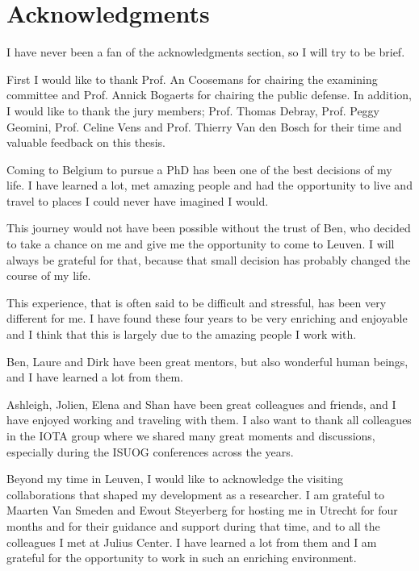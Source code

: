 \chapter*{Acknowledgments}

I have never been a fan of the acknowledgments section, so I will try to be brief.

\vspace{1em}

First I would like to thank Prof. An Coosemans for chairing the examining committee and Prof. Annick Bogaerts for chairing the public defense. In addition, I would like to thank the jury members; Prof. Thomas Debray, Prof. Peggy Geomini, Prof. Celine Vens and Prof. Thierry Van den Bosch for their time and valuable feedback on this thesis.

\vspace{1em}

Coming to Belgium to pursue a PhD has been one of the best decisions of my life. I have learned a lot, met amazing people and had the opportunity to live and travel to places I could never have imagined I would. 

This journey would not have been possible without the trust of Ben, who decided to take a chance on me and give me the opportunity to come to Leuven. I will always be grateful for that, because that small decision has probably changed the course of my life. 

This experience, that is often said to be difficult and stressful, has been very different for me. I have found these four years to be very enriching and enjoyable and I think that this is largely due to the amazing people I work with. 

\vspace{1em}

Ben, Laure and Dirk have been great mentors, but also wonderful human beings, and I have learned a lot from them. 

Ashleigh, Jolien, Elena and Shan have been great colleagues and friends, and I have enjoyed working and traveling with them. I also want to thank all colleagues in the IOTA group where we shared many great moments and discussions, especially during the ISUOG conferences across the years. 

\vspace{1em}

Beyond my time in Leuven, I would like to acknowledge the visiting collaborations that shaped my development as a researcher. I am grateful to Maarten Van Smeden and Ewout Steyerberg for hosting me in Utrecht for four months and for their guidance and support during that time, and to all the colleagues I met at Julius Center. I have learned a lot from them and I am grateful for the opportunity to work in such an enriching environment.

